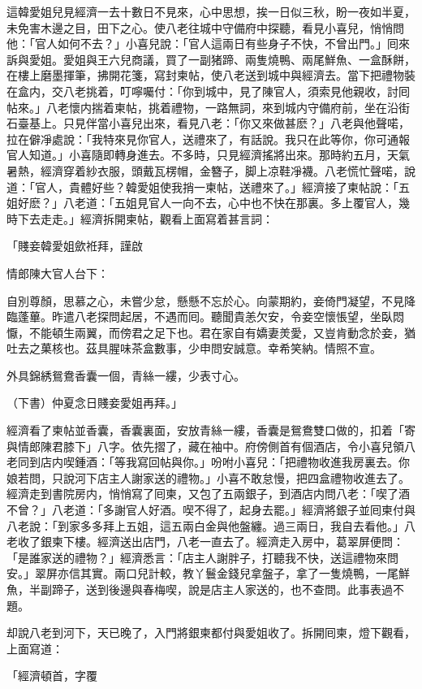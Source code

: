 這韓愛姐兒見經濟一去十數日不見來，心中思想，挨一日似三秋，盼一夜如半夏，未免害木邊之目，田下之心。使八老往城中守備府中探聽，看見小喜兒，悄悄問他：「官人如何不去？」小喜兒說：「官人這兩日有些身子不快，不曾出門。」囘來訴與愛姐。愛姐與王六兒商議，買了一副猪蹄、兩隻燒鴨、兩尾鮮魚、一盒酥餅，在樓上磨墨揮筆，拂開花箋，寫封柬帖，使八老送到城中與經濟去。當下把禮物裝在盒内，交八老挑着，叮嚀囑付：「你到城中，見了陳官人，須索見他親收，討囘帖來。」八老懷内揣着柬帖，挑着禮物，一路無詞，來到城内守備府前，坐在沿街石臺基上。只見伴當小喜兒出來，看見八老：「你又來做甚麽？」八老與他聲喏，拉在僻凈處說：「我特來見你官人，送禮來了，有話說。我只在此等你，你可通報官人知道。」小喜隨即轉身進去。不多時，只見經濟搖將出來。那時約五月，天氣暑熱，經濟穿着紗衣服，頭戴瓦楞帽，金簪子，脚上凉鞋凈襪。八老慌忙聲喏，說道：「官人，貴體好些？韓愛姐使我捎一柬帖，送禮來了。」經濟接了柬帖說：「五姐好麽？」八老道：「五姐見官人一向不去，心中也不快在那裏。多上覆官人，幾時下去走走。」經濟拆開柬帖，觀看上面寫着甚言詞：

「賤妾韓愛姐歛袵拜，謹啟

情郎陳大官人台下：

自別尊顏，思慕之心，未嘗少怠，懸懸不忘於心。向蒙期約，妾倚門凝望，不見降臨蓬蓽。昨遣八老探問起居，不遇而囘。聽聞貴恙欠安，令妾空懷悵望，坐臥悶懨，不能頓生兩翼，而傍君之足下也。君在家自有嬌妻羙愛，又豈肯動念於妾，猶吐去之菓核也。茲具腥味茶盒數事，少申問安誠意。幸希笑納。情照不宣。

外具錦綉鴛鴦香囊一個，青絲一縷，少表寸心。

（下書）仲夏念日賤妾愛姐再拜。」

經濟看了柬帖並香囊，香囊裏面，安放青絲一縷，香囊是鴛鴦雙口做的，扣着「寄與情郎陳君膝下」八字。依先摺了，藏在袖中。府傍側首有個酒店，令小喜兒領八老同到店内喫鍾酒：「等我寫回帖與你。」吩咐小喜兒：「把禮物收進我房裏去。你娘若問，只說河下店主人謝家送的禮物。」小喜不敢怠慢，把四盒禮物收進去了。經濟走到書院房内，悄悄寫了囘柬，又包了五兩銀子，到酒店内問八老：「喫了酒不曾？」八老道：「多謝官人好酒。喫不得了，起身去罷。」經濟將銀子並囘柬付與八老說：「到家多多拜上五姐，這五兩白金與他盤纏。過三兩日，我自去看他。」八老收了銀柬下樓。經濟送出店門，八老一直去了。經濟走入房中，葛翠屏便問：「是誰家送的禮物？」經濟悉言：「店主人謝胖子，打聽我不快，送這禮物來問安。」翠屏亦信其實。兩口兒計較，教丫鬟金錢兒拿盤子，拿了一隻燒鴨，一尾鮮魚，半副蹄子，送到後邊與春梅喫，說是店主人家送的，也不查問。此事表過不題。

却說八老到河下，天已晚了，入門將銀柬都付與愛姐收了。拆開囘柬，燈下觀看，上面寫道：

「經濟頓首，字覆

